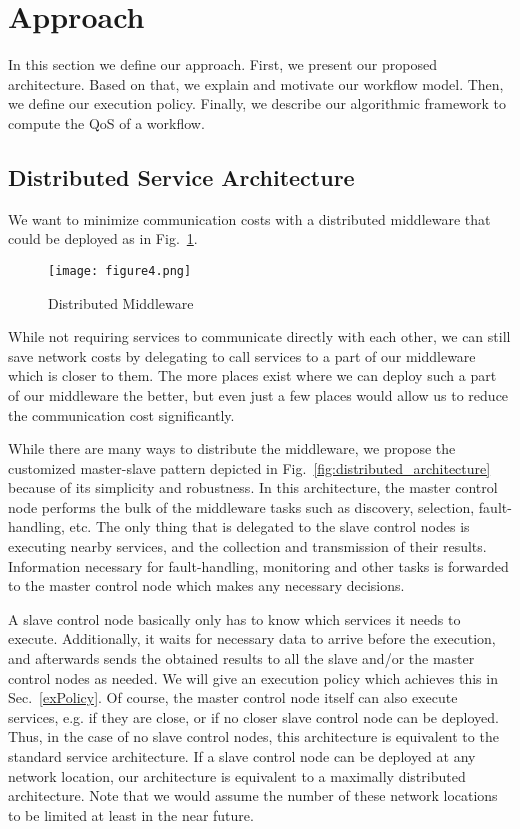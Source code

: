 \documentclass[10pt, conference, compsocconf]{IEEEtran}
\newcommand{\twoImages}{1.6in}
\begin{document}
\section{Approach}
\label{approach}
\noindent In this section we define our approach.
First, we present our proposed architecture.
Based on that, we explain and motivate our workflow model.
Then, we define our execution policy.
Finally, we describe our algorithmic framework to compute the QoS of a workflow.

\subsection{Distributed Service Architecture}
\noindent We want to minimize communication costs with a distributed middleware	that could be deployed as in Fig.~\ref{fig:distributed_middleware}.

\begin{figure}[htb!]
	\centering
	\texttt{[image: figure4.png]}
	\caption{Distributed Middleware}
	\label{fig:distributed_middleware}
\end{figure}

\noindent While not requiring services to communicate directly with each other,
	we can still save network costs by delegating to call services to a part of our middleware  which is closer to them.
The more places exist where we can deploy such a part of our middleware the better,
	but even just a few places would allow us to reduce the communication cost significantly.

While there are many ways to distribute the middleware,
	we propose the customized master-slave pattern depicted in Fig.~\ref{fig:distributed_architecture}
		because of its simplicity and robustness.
In this architecture, the master control node performs the bulk of the middleware tasks
	such as discovery, selection, fault-handling, etc.
The only thing that is delegated to the slave control nodes is executing nearby services,
	and the collection and transmission of their results.
Information necessary for fault-handling, monitoring and other tasks is forwarded to the master control node
	which makes any necessary decisions.

A slave control node basically only has to know which services it needs to execute.
Additionally, it waits for necessary data to arrive before the execution,
	and afterwards sends the obtained results to all the slave and/or the master control nodes as needed.
We will give an execution policy which achieves this in Sec.~\ref{exPolicy}.
Of course, the master control node itself can also execute services, e.g. if they are close,
	or if no closer slave control node can be deployed.
Thus, in the case of no slave control nodes,	this architecture is equivalent to the standard service architecture.
If a slave control node can be deployed at any network location,
	our architecture is equivalent to a maximally distributed architecture.
Note that we would assume the number of these network locations to be limited at least in the near future.
\end{document}
